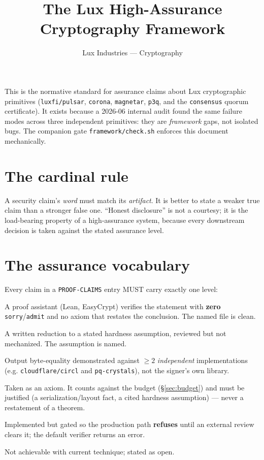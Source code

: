 \documentclass[11pt]{article}
\title{The Lux High-Assurance Cryptography Framework}
\author{Lux Industries --- Cryptography}
\date{}
\begin{document}
\maketitle

\noindent
This is the normative standard for assurance claims about Lux cryptographic
primitives (\texttt{luxfi/pulsar}, \texttt{corona}, \texttt{magnetar},
\texttt{p3q}, and the \texttt{consensus} quorum certificate). It exists
because a 2026-06 internal audit found the same failure modes across three
independent primitives: they are \emph{framework} gaps, not isolated bugs. The
companion gate \texttt{framework/check.sh} enforces this document mechanically.

\section{The cardinal rule}
A security claim's \emph{word} must match its \emph{artifact}. It is better to
state a weaker true claim than a stronger false one. ``Honest disclosure'' is
not a courtesy; it is the load-bearing property of a high-assurance system,
because every downstream decision is taken against the stated assurance level.

\section{The assurance vocabulary}
Every claim in a \texttt{PROOF-CLAIMS} entry MUST carry exactly one level:
\begin{description}[leftmargin=2.2cm,style=nextline]
  \item[machine-checked] A proof assistant (Lean, EasyCrypt) verifies the
    statement with \textbf{zero} \texttt{sorry}/\texttt{admit} and no axiom
    that restates the conclusion. The named file is clean.
  \item[sound-by-reduction] A written reduction to a stated hardness
    assumption, reviewed but not mechanized. The assumption is named.
  \item[interop-tested] Output byte-equality demonstrated against
    $\geq 2$ \emph{independent} implementations (e.g. \texttt{cloudflare/circl}
    and \texttt{pq-crystals}), not the signer's own library.
  \item[asserted-axiom] Taken as an axiom. It counts against the budget
    (\S\ref{sec:budget}) and must be justified (a serialization/layout fact,
    a cited hardness assumption) --- never a restatement of a theorem.
  \item[fail-closed-pending-review] Implemented but gated so the production
    path \textbf{refuses} until an external review clears it; the default
    verifier returns an error.
  \item[open-research] Not achievable with current technique; stated as open.
\end{description}
\end{document}
